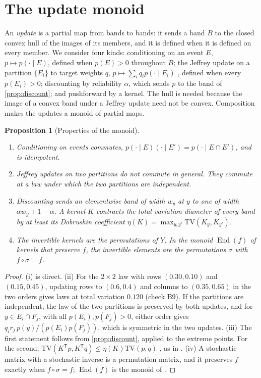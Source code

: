 \documentclass[11pt]{article}
\newtheorem{proposition}[theorem]{Proposition}
\theoremstyle{definition}
\theoremstyle{remark}
\newcommand{\TV}{\mathrm{TV}}
\newcommand{\T}{\mathsf T}
\begin{document}
\section{The update monoid}\label{sec:monoid}

An \emph{update} is a partial map from bands to bands: it sends a band $B$ to the closed convex hull of the images of its
members, and it is defined when it is defined on every member. We consider four kinds: conditioning on an event $E$,
$p\mapsto p(\cdot\mid E)$, defined when $p(E)>0$ throughout $B$; the Jeffrey update on a partition $\{E_i\}$ to target weights
$q$, $p\mapsto\sum_iq_ip(\cdot\mid E_i)$ \cite{DiaconisZabell1982}, defined when every $p(E_i)>0$; discounting by reliability
$\alpha$, which sends $p$ to the band of \cref{prop:discount}; and pushforward by a kernel. The hull is needed because the image
of a convex band under a Jeffrey update need not be convex. Composition makes the updates a monoid of partial maps.

\begin{proposition}[Properties of the monoid]\label{prop:monoid}
\begin{enumerate}[label=(\roman*)]
\item Conditioning on events commutes, $p(\cdot\mid E)(\cdot\mid E')=p(\cdot\mid E\cap E')$, and is idempotent.
\item Jeffrey updates on two partitions do not commute in general. They commute at a law under which the two partitions are
  independent.
\item Discounting sends an elementwise band of width $w_y$ at $y$ to one of width $\alpha w_y+1-\alpha$. A kernel $K$ contracts the total-variation diameter of every
  band by at least its Dobrushin coefficient $\eta(K)=\max_{y,y'}\TV(K_y,K_{y'})$.
\item The invertible kernels are the permutations of $Y$. In the monoid $\operatorname{End}(f)$ of kernels that preserve $f$, the
  invertible elements are the permutations $\sigma$ with $f\circ\sigma=f$.
\end{enumerate}
\end{proposition}
\begin{proof}
(i) is direct. (ii) For the $2\times2$ law with rows $(0.30,0.10)$ and $(0.15,0.45)$, updating rows to $(0.6,0.4)$ and columns
to $(0.35,0.65)$ in the two orders gives laws at total variation $0.120$ (check B9). If the partitions are independent, the law
of the two partitions is preserved by both updates, and for $y\in E_i\cap F_j$, with all $p(E_i),p(F_j)>0$, either order gives
$q_ir_j\,p(y)/(p(E_i)p(F_j))$, which is symmetric in the two updates. (iii) The
first statement follows from \cref{prop:discount}, applied to the extreme points. For the second, $\TV(K^\T p,K^\T q)\le\eta(K)\TV(p,q)$ \cite{Dobrushin1956}, as in
\cite[Prop.~11.2]{Tower}. (iv) A stochastic matrix with a stochastic inverse is a permutation matrix, and it preserves $f$ exactly
when $f\circ\sigma=f$; $\operatorname{End}(f)$ is the monoid of \cite[Prop.~3.1]{Algebras}.
\end{proof}
\end{document}
